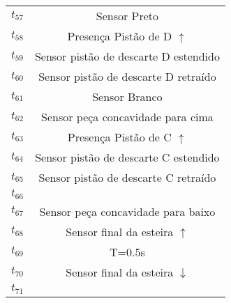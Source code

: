 \begin{table}[htbp]
\begin{tabular}{c|c}
\hyperlink{partialNet:t57}{\hypertarget{partialTable:t57}{$t_{57}$}} & Sensor Preto\\
\hyperlink{partialNet:t58}{\hypertarget{partialTable:t58}{$t_{58}$}} & Presença Pistão de D \(\uparrow\)\\
\hyperlink{partialNet:t59}{\hypertarget{partialTable:t59}{$t_{59}$}} & Sensor pistão de descarte D estendido\\
\hyperlink{partialNet:t60}{\hypertarget{partialTable:t60}{$t_{60}$}} & Sensor pistão de descarte D retraído\\
\hyperlink{partialNet:t61}{\hypertarget{partialTable:t61}{$t_{61}$}} & Sensor Branco\\
\hyperlink{partialNet:t62}{\hypertarget{partialTable:t62}{$t_{62}$}} & Sensor peça concavidade para cima\\
\hyperlink{partialNet:t63}{\hypertarget{partialTable:t63}{$t_{63}$}} & Presença Pistão de C \(\uparrow\)\\
\hyperlink{partialNet:t64}{\hypertarget{partialTable:t64}{$t_{64}$}} & Sensor pistão de descarte C estendido\\
\hyperlink{partialNet:t65}{\hypertarget{partialTable:t65}{$t_{65}$}} & Sensor pistão de descarte C retraído\\
\hyperlink{partialNet:t66}{\hypertarget{partialTable:t66}{$t_{66}$}} & \\
\hyperlink{partialNet:t67}{\hypertarget{partialTable:t67}{$t_{67}$}} & Sensor peça concavidade para baixo\\
\hyperlink{partialNet:t68}{\hypertarget{partialTable:t68}{$t_{68}$}} & Sensor final da esteira \(\uparrow\)\\
\hyperlink{partialNet:tt69}{\hypertarget{partialTable:tt69}{$t_{69}$}} & T=0.5s\\
\hyperlink{partialNet:t70}{\hypertarget{partialTable:t70}{$t_{70}$}} & Sensor final da esteira \(\downarrow\)\\
\hyperlink{partialNet:t71}{\hypertarget{partialTable:t71}{$t_{71}$}} & \\
\end{tabular}
\end{table}
